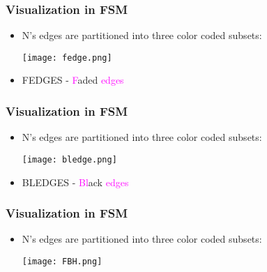 \documentclass{beamer}
\begin{document}
\begin{frame}[fragile]
\frametitle{Visualization in FSM}
\begin{scriptsize}
\begin{itemize}
\normalsize
\item<1-> N's edges are partitioned into three color coded subsets: \newline

\begin{center}
\texttt{[image: fedge.png]}
\end{center}

\item<1-> FEDGES - \textcolor{magenta}{F}aded \textcolor{magenta}{edges}

\end{itemize}
\end{scriptsize}
\end{frame}

\begin{frame}[fragile]
\frametitle{Visualization in FSM}
\begin{scriptsize}
\begin{itemize}
\normalsize
\item<1-> N's edges are partitioned into three color coded subsets: \newline

\begin{center}
\texttt{[image: bledge.png]}
\end{center}

\item<1-> BLEDGES - \textcolor{magenta}{Bl}ack \textcolor{magenta}{edges}

\end{itemize}
\end{scriptsize}
\end{frame}

\begin{frame}[fragile]
\frametitle{Visualization in FSM}
\begin{scriptsize}
\begin{itemize}
\normalsize
\item<1-> N's edges are partitioned into three color coded subsets: \newline

\begin{center}
\texttt{[image: FBH.png]}
\end{center}

\end{itemize}
\end{scriptsize}
\end{frame}
\end{document}
